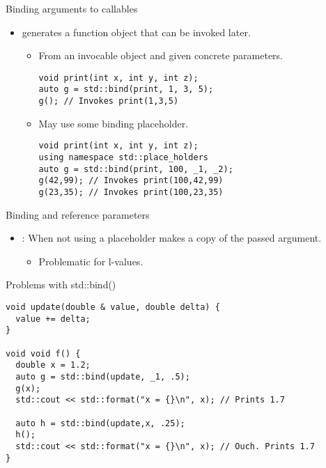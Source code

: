 \begin{frame}[t,fragile]{Binding arguments to callables}
\begin{itemize}
  \item {} generates a function object that can be invoked later.

    \begin{itemize}
      \item From an invocable object and given concrete parameters.
\begin{lstlisting}
void print(int x, int y, int z);
auto g = std::bind(print, 1, 3, 5);
g(); // Invokes print(1,3,5)
\end{lstlisting}

      \item May use some binding placeholder.
\begin{lstlisting}
void print(int x, int y, int z);
using namespace std::place_holders
auto g = std::bind(print, 100, _1, _2);
g(42,99); // Invokes print(100,42,99)
g(23,35); // Invokes print(100,23,35)
\end{lstlisting}
    \end{itemize}
\end{itemize}
\end{frame}

\begin{frame}[t,fragile]{Binding and reference parameters}
\begin{itemize}
  \item {}: When not using a placeholder  makes a copy
        of the passed argument.
    \begin{itemize}
      \item Problematic for l-values.
    \end{itemize}
\end{itemize}

\begin{block}{Problems with std::bind()}
\begin{lstlisting}[basicstyle=\tiny]
void update(double & value, double delta) {
  value += delta;
}

void void f() {
  double x = 1.2; 
  auto g = std::bind(update, _1, .5);
  g(x);
  std::cout << std::format("x = {}\n", x); // Prints 1.7

  auto h = std::bind(update,x, .25);
  h();
  std::cout << std::format("x = {}\n", x); // Ouch. Prints 1.7
}
\end{lstlisting}
\end{block}
\end{frame}

